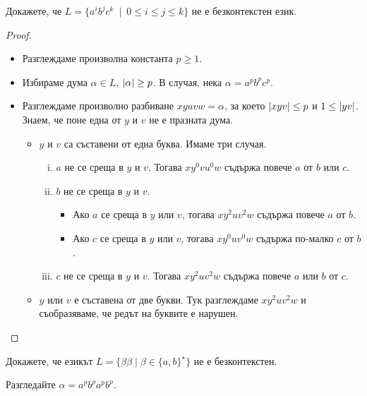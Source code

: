 \begin{problem}
  Докажете, че $L = \{a^ib^jc^k\ \mid\ 0 \leq i \leq j \leq k\}$ не е безконтекстен език.
\end{problem}
\begin{proof}
   \begin{itemize}
   \item 
     Разглеждаме произволна константа $p \geq 1$.
   \item
     Избираме дума $\alpha \in L$, $\lvert{\alpha}\rvert \geq p$.
     В случая, нека $\alpha = a^pb^pc^p$.
   \item
     Разглеждаме произволно разбиване $xyuvw = \alpha$, за което $\lvert{xyv}\rvert \leq p$ и $1 \leq \lvert{yv}\rvert$.
     Знаем, че поне една от $y$ и $v$ не е празната дума.
    \begin{itemize}
    \item
      $y$ и $v$ са съставени от една буква.
      Имаме три случая.
      \begin{enumerate}[i)]
      \item
        $a$ не се среща в $y$ и $v$.
        Тогава $xy^0vu^0w$ съдържа повече $a$ от $b$ или $c$.
      \item
        $b$ не се среща в $y$ и $v$.
        \begin{itemize}
        \item 
          Ако $a$ се среща в $y$ или $v$, тогава $xy^2uv^2w$ съдържа повече $a$ от $b$.
        \item
          Ако $c$ се среща в $y$ или $v$, тогава $xy^0uv^0w$ съдържа по-малко $c$ от $b$.
        \end{itemize}
      \item
        $c$ не се среща в $y$ и $v$.
        Тогава $xy^2uv^2w$ съдържа повече $a$ или $b$ от $c$.
      \end{enumerate}      
     \item
       $y$ или $v$ е съставена от две букви.
       Тук разглеждаме $xy^2uv^2w$ и съобразяваме, че редът на буквите е нарушен.
     \end{itemize}    
   \end{itemize}
\end{proof}

\begin{problem}
  Докажете, че езикът $L = \{\beta\beta\mid \beta\in \{a,b\}^\star\}$ не е безконтекстен.
\end{problem}
\begin{hint}
  Разгледайте $\alpha = a^pb^pa^pb^p$.
\end{hint}

